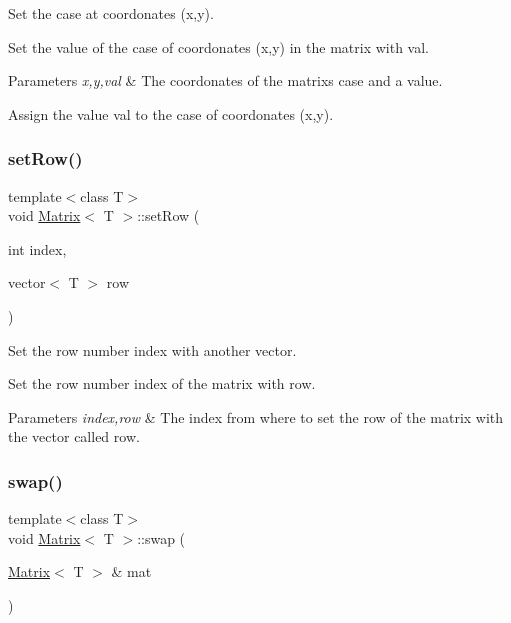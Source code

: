 Set the case at coordonates (x,y). 

Set the value of the case of coordonates (x,y) in the matrix with val.


\begin{DoxyParams}{Parameters}
{\em x,y,val} & The coordonates of the matrix\textquotesingle{}s case and a value.\\
\hline
\end{DoxyParams}
Assign the value val to the case of coordonates (x,y). \mbox{\label{class_matrix_ad594e62f75a6dd6d1bcd903b33a09e61}} 
\subsubsection{\texorpdfstring{set\+Row()}{setRow()}}
{\footnotesize\ttfamily template$<$class T$>$ \\
void \mbox{\hyperlink{class_matrix}{Matrix}}$<$ T $>$\+::set\+Row (\begin{DoxyParamCaption}\item[{int}]{index,  }\item[{vector$<$ T $>$}]{row }\end{DoxyParamCaption})}



Set the row number index with another vector. 

Set the row number index of the matrix with row.


\begin{DoxyParams}{Parameters}
{\em index,row} & The index from where to set the row of the matrix with the vector called row. \\
\hline
\end{DoxyParams}
\mbox{\label{class_matrix_a39fc509f53b388925f388a66010da58a}} 
\subsubsection{\texorpdfstring{swap()}{swap()}}
{\footnotesize\ttfamily template$<$class T$>$ \\
void \mbox{\hyperlink{class_matrix}{Matrix}}$<$ T $>$\+::swap (\begin{DoxyParamCaption}\item[{\mbox{\hyperlink{class_matrix}{Matrix}}$<$ T $>$ \&}]{mat }\end{DoxyParamCaption})}




